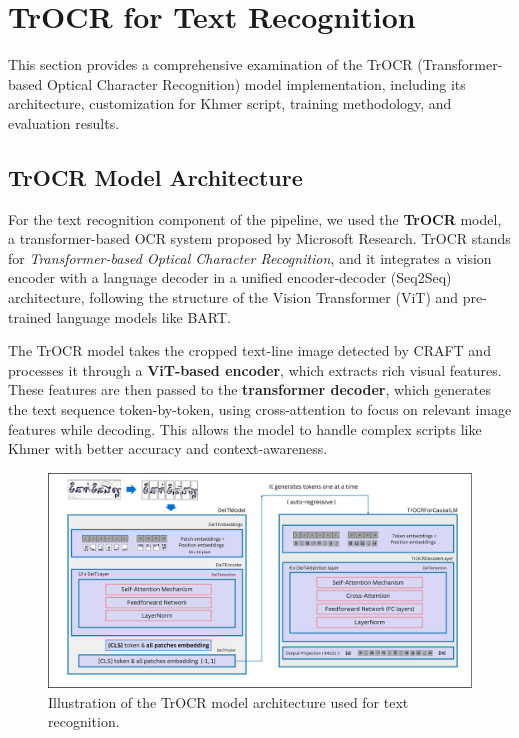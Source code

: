 \section{TrOCR for Text Recognition}
\label{sec:trocr-complete}

This section provides a comprehensive examination of the TrOCR (Transformer-based Optical Character Recognition) model implementation, including its architecture, customization for Khmer script, training methodology, and evaluation results.

\subsection{TrOCR Model Architecture}
\label{subsec:trocr-architecture}

For the text recognition component of the pipeline, we used the \textbf{TrOCR} model, a transformer-based OCR system proposed by Microsoft Research. TrOCR stands for \textit{Transformer-based Optical Character Recognition}, and it integrates a vision encoder with a language decoder in a unified encoder-decoder (Seq2Seq) architecture, following the structure of the Vision Transformer (ViT) and pre-trained language models like BART.

The TrOCR model takes the cropped text-line image detected by CRAFT and processes it through a \textbf{ViT-based encoder}, which extracts rich visual features. These features are then passed to the \textbf{transformer decoder}, which generates the text sequence token-by-token, using cross-attention to focus on relevant image features while decoding. This allows the model to handle complex scripts like Khmer with better accuracy and context-awareness.

\begin{figure}[H]
    \centering
    \includegraphics[width=\textwidth]{figures/trocr_model.png}
    \caption{Illustration of the TrOCR model architecture used for text recognition.}
    \label{fig:trocr-model}
\end{figure}

